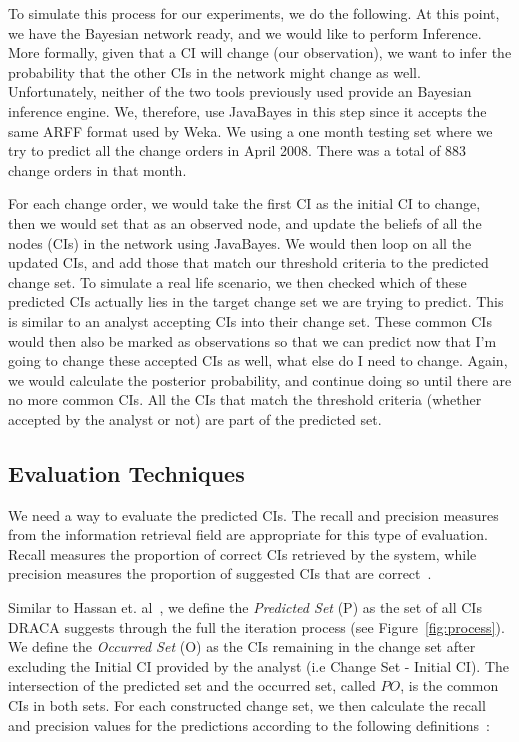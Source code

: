 \documentclass{article}
\begin{document}
To simulate this process for our experiments, we do the following. At this point, we have the Bayesian network ready, and we would like to perform Inference.
More formally, given that a CI will change (our observation), we want to infer the probability that the other CIs in the network might change as well.
Unfortunately, neither of the two tools previously used provide an Bayesian inference engine. We, therefore, use JavaBayes in this step since it accepts the
same ARFF format used by Weka. We using a one month testing set where we try to predict all the change orders in April 2008. There was a total of
883 change orders in that month. 

For each change order, we would take the first CI as the initial CI to change, then we would set that as an observed node, and update
the beliefs of all the nodes (CIs) in the network using JavaBayes. We would then loop on all the updated CIs, and add those that match our threshold criteria to
the predicted change set. To simulate a real life scenario, we then checked which of these predicted CIs actually lies in the target change set we are trying to
predict. This is similar to an analyst accepting CIs into their change set. These common CIs would then also be marked as observations so that we can predict
now that I'm going to change these accepted CIs as well, what else do I need to change. Again, we would calculate the posterior probability, and continue doing
so until there are no more common CIs. All the CIs that match the threshold criteria (whether accepted by the analyst or not) are part of the predicted
set.

\subsection{Evaluation Techniques}

We need a way to evaluate the predicted CIs. The recall and precision measures from the information retrieval field are appropriate for this type of evaluation.
Recall measures the proportion of correct CIs retrieved by the system, while precision measures the proportion of suggested CIs that are correct~\cite{van79}.

Similar to Hassan et. al~\cite{hassan2004predicting}, we define the \textit{Predicted Set} (P) as the set of all CIs DRACA suggests through the full the
iteration process (see Figure~\ref{fig:process}). We define the \textit{Occurred Set} (O) as the CIs remaining in the change set after excluding the Initial CI
provided by the analyst (i.e Change Set - Initial CI). The intersection of the predicted set and the occurred set, called $PO$, is the common CIs in both sets.
For each constructed change set, we then calculate the recall and precision values for the predictions according to the following
definitions~\cite{hassan2004predicting}:
\end{document}
